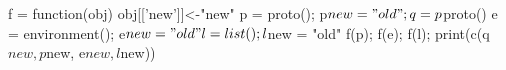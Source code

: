 f = function(obj) obj[['new']]<-"new"
p = proto(); p$new = "old"; q = p$proto()
e = environment(); e$new="old"
l = list(); l$new = "old"
f(p); f(e); f(l); print(c(q$new, p$new, e$new, l$new))

